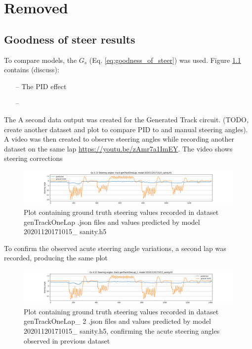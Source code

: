 \chapter{Removed} %

\label{Removed}

\section{Goodness of steer results}


To compare models, the $G_s$ (Eq. \ref{eq:goodness_of_steer}) was used. Figure  \ref{fig:genTrackOneLap_20201120171015_sanity_gos} contains (discuss):
\begin{itemize}
    \item[--] The PID effect
    \item[--] 
\end{itemize}
The
A second data output was created for the Generated Track circuit. (TODO, create another dataset and plot to compare PID to and manual steering angles).
A video was then created to observe steering angles while recording another dataset on the same lap \href{https://youtu.be/zAmr7a1ImEY}{https://youtu.be/zAmr7a1ImEY}. The video shows steering corrections

\begin{figure}[ht]
 \centering 
 \includegraphics[width=\textwidth]{Figures/sa_genTrackOneLap_20201120171015_sanity.h5.png}
 \caption{Plot containing ground truth steering values recorded in dataset genTrackOneLap .json files and values predicted by model 20201120171015\_ sanity.h5}
 \label{fig:genTrackOneLap_20201120171015_sanity_gos} 
\end{figure}

To confirm the observed acute steering angle variations, a second lap was recorded, producing the same plot
 \label{fig:a_genTrackOneLap_2_20201120171015_sanity} 

\begin{figure}[ht]
 \centering 
 \includegraphics[width=\textwidth]{Figures/sa_genTrackOneLap_2_20201120171015_sanity.h5.png}
 \caption{Plot containing ground truth steering values recorded in dataset genTrackOneLap\_ 2 .json files and values predicted by model 20201120171015\_ sanity.h5, confirming the acute steering angles observed in previous dataset}
 \label{fig:a_genTrackOneLap_2_20201120171015_sanity} 
\end{figure}

